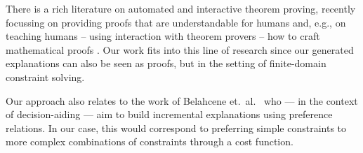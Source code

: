 There is a rich literature on automated and interactive theorem proving, recently focussing on providing proofs that are understandable for humans \cite{Ganesalingam2017} and, e.g.,  on teaching humans -- using interaction with theorem provers -- how to craft mathematical proofs \cite{DBLP:conf/icml/YangD19}.
Our work fits into this line of research since our generated explanations can also be seen as proofs, but in the setting of finite-domain constraint solving.

Our approach also relates to the work of Belahcene et.\ al.~\cite{belahcene2017explaining} who --- in the context of decision-aiding --- aim to build incremental explanations using preference relations. In our case, this would correspond to preferring simple constraints to more complex combinations of constraints through a cost function.

